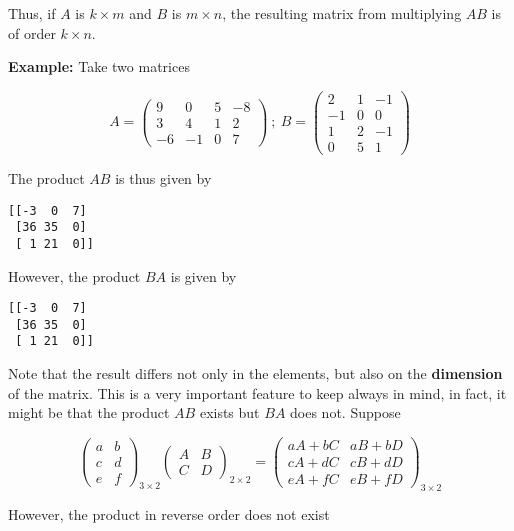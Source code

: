 \documentclass[11pt]{article}
\begin{document}
Thus, if \(A\) is \(k\times m\) and \(B\) is \(m\times n\), the
resulting matrix from multiplying \(AB\) is of order \(k\times n\).

\textbf{Example:} Take two matrices

\[
A = \begin{pmatrix} 9 & 0 & 5 & -8 \\ 3 & 4 & 1 & 2 \\ -6 & -1 & 0 & 7 \end{pmatrix} \: ; \: B = \begin{pmatrix} 2 & 1 & -1 \\ -1 & 0 & 0 \\ 1 & 2 & -1 \\ 0 & 5 & 1 \end{pmatrix}
\]

The product \(AB\) is thus given by

    \begin{Verbatim}[commandchars=\\\{\}]
[[-3  0  7]
 [36 35  0]
 [ 1 21  0]]
\end{Verbatim}

    However, the product \(BA\) is given by

    \begin{Verbatim}[commandchars=\\\{\}]
[[-3  0  7]
 [36 35  0]
 [ 1 21  0]]
\end{Verbatim}

    Note that the result differs not only in the elements, but also on the
\textbf{dimension} of the matrix. This is a very important feature to
keep always in mind, in fact, it might be that the product \(AB\) exists
but \(BA\) does not. Suppose

\[
\begin{pmatrix} a & b \\ c & d \\ e & f \end{pmatrix}_{3\times 2} \begin{pmatrix} A & B \\ C & D \end{pmatrix}_{2\times 2} = \begin{pmatrix} aA + bC & aB + bD \\ cA + dC & cB + dD \\ eA + fC & eB + fD \end{pmatrix}_{3\times 2}
\]

However, the product in reverse order does not exist
\end{document}
